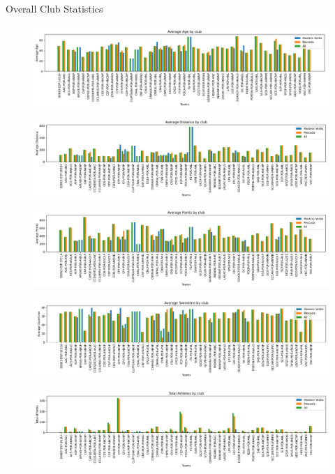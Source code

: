 \documentclass[aspectratio=169, xcolor=dvipsnames]{beamer}
\begin{document}
\begin{frame}[allowframebreaks]{Overall Club Statistics}
\begin{figure}
    \centering
    \includegraphics[width=\textwidth]{img/1.png}
\end{figure}

\begin{figure}
    \centering
    \includegraphics[width=\textwidth]{img/2.png}
\end{figure}

\begin{figure}
    \centering
    \includegraphics[width=\textwidth]{img/3.png}
\end{figure}

\begin{figure}
    \centering
    \includegraphics[width=\textwidth]{img/4.png}
\end{figure}

\begin{figure}
    \centering
    \includegraphics[width=\textwidth]{img/5.png}
\end{figure}

\end{frame}
\end{document}
